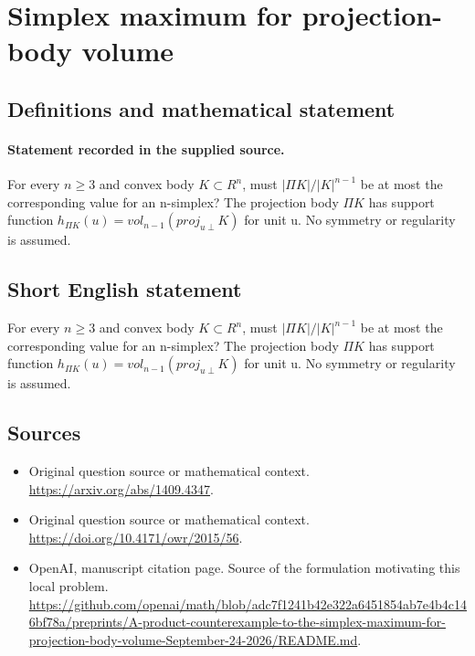 \documentclass[11pt]{article}
\begin{document}
\section*{Simplex maximum for projection-body volume}\label{30007114}
\subsection{Definitions and mathematical statement}
\paragraph{Statement recorded in the supplied source.}
For every $n\geq 3$ and convex body $K\subset R^{n}$, must $|\Pi K|/|K|^{n-1}$ be at most the corresponding value for an n-simplex? The projection body $\Pi K$ has support function $h_{\Pi K}(u)=vol_{n-1}(proj_{u\perp }K)$ for unit u. No symmetry or regularity is assumed.
\subsection{Short English statement}
For every $n\geq 3$ and convex body $K\subset R^{n}$, must $|\Pi K|/|K|^{n-1}$ be at most the corresponding value for an n-simplex? The projection body $\Pi K$ has support function $h_{\Pi K}(u)=vol_{n-1}(proj_{u\perp }K)$ for unit u. No symmetry or regularity is assumed.
\subsection{Sources}
\begin{itemize}
\item[S1] Original question source or mathematical context.
\url{https://arxiv.org/abs/1409.4347}.
\item[S2] Original question source or mathematical context.
\url{https://doi.org/10.4171/owr/2015/56}.
\item[S3] OpenAI, manuscript citation page. Source of the formulation motivating this local problem.
\url{https://github.com/openai/math/blob/adc7f1241b42e322a6451854ab7e4b4c146bf78a/preprints/A-product-counterexample-to-the-simplex-maximum-for-projection-body-volume-September-24-2026/README.md}.
\end{itemize}
\end{document}
